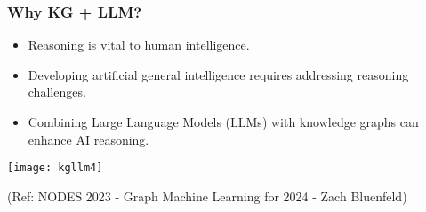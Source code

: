 \begin{frame}[fragile]\frametitle{Why KG + LLM?}
    \begin{itemize}
        \item Reasoning is vital to human intelligence.
        \item Developing artificial general intelligence requires addressing reasoning challenges.
        \item Combining Large Language Models (LLMs) with knowledge graphs can enhance AI reasoning.
    \end{itemize}
	
\begin{center}
\texttt{[image: kgllm4]}
\end{center}	

{\tiny (Ref: NODES 2023 - Graph Machine Learning for 2024 - Zach Bluenfeld)}	
\end{frame}





